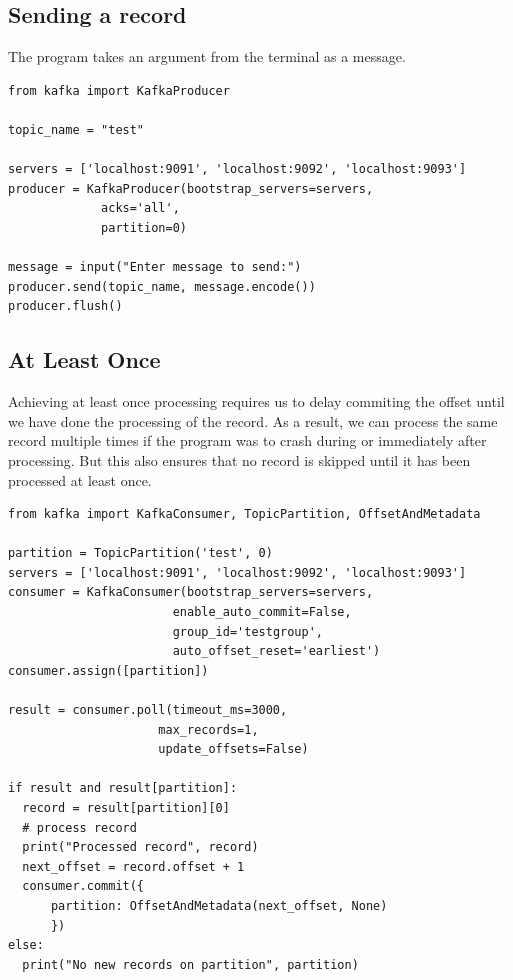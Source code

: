 \documentclass[11pt]{article}
\begin{document}
\subsection{Sending a record}
The program takes an argument from the terminal as a message.
\newline
\begin{adjustwidth}{-30pt}{0pt}
\begin{Verbatim}
from kafka import KafkaProducer

topic_name = "test"

servers = ['localhost:9091', 'localhost:9092', 'localhost:9093']
producer = KafkaProducer(bootstrap_servers=servers,
			 acks='all',
			 partition=0)

message = input("Enter message to send:")
producer.send(topic_name, message.encode())
producer.flush()
\end{Verbatim}
\end{adjustwidth}

\clearpage
\subsection{At Least Once}
Achieving at least once processing requires us to delay commiting the offset until we have done the processing of the record. As a result, we can process the same record multiple times if the program was to crash during or immediately after processing. But this also ensures that no record is skipped until it has been processed at least once.
\newline
\begin{adjustwidth}{-30pt}{0pt}
\begin{Verbatim}
from kafka import KafkaConsumer, TopicPartition, OffsetAndMetadata

partition = TopicPartition('test', 0)
servers = ['localhost:9091', 'localhost:9092', 'localhost:9093']
consumer = KafkaConsumer(bootstrap_servers=servers,
                       enable_auto_commit=False,
                       group_id='testgroup',
                       auto_offset_reset='earliest')
consumer.assign([partition])

result = consumer.poll(timeout_ms=3000,
                     max_records=1,
                     update_offsets=False)

if result and result[partition]:
  record = result[partition][0]
  # process record
  print("Processed record", record)
  next_offset = record.offset + 1
  consumer.commit({
      partition: OffsetAndMetadata(next_offset, None)
      })
else:
  print("No new records on partition", partition)
\end{Verbatim}
\end{adjustwidth}
\end{document}
